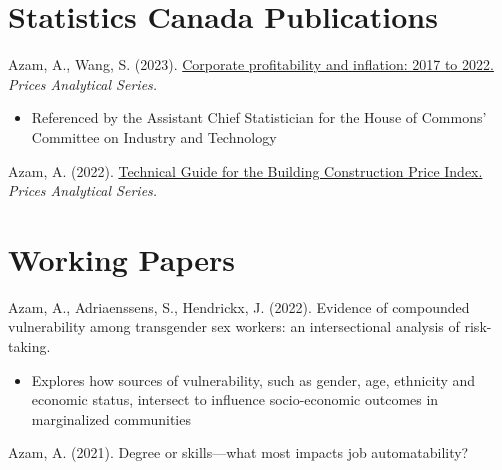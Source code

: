 \documentclass[letterpaper,11pt]{article}
\newcommand{\resumeItem}[1]{
  \item\small{
    {#1 \vspace{-2pt}}
  }
}
\newcommand{\resumeItemListStart}{\begin{itemize}}
\newcommand{\resumeItemListEnd}{\end{itemize}\vspace{-5pt}}
\begin{document}
\section{Statistics Canada Publications}

\begin{itemize}[leftmargin=0.15in, label={}]
    {\item{
     Azam, A., Wang, S. (2023). \href{https://www150.statcan.gc.ca/n1/en/catalogue/62F0014M2023004}{Corporate profitability and inflation: 2017 to 2022.} \textit{Prices Analytical Series.}
    }}
    \vspace{-8pt} 
 \end{itemize}
 
        \resumeItemListStart
        \resumeItem{Referenced by the Assistant Chief Statistician for the House of Commons’ Committee on Industry and Technology}
        \vspace{-10pt} 
        \resumeItemListEnd 

\begin{itemize}[leftmargin=0.15in, label={}]
    {\item{
    Azam, A. (2022). \href{https://www150.statcan.gc.ca/n1/pub/62f0014m/62f0014m2022005-eng.htm}{Technical Guide for the Building Construction Price Index.} \textit{Prices Analytical Series.}
    }}
 \end{itemize}

\section{Working Papers}

\begin{itemize}[leftmargin=0.15in, label={}]
    {\item{
     Azam, A., Adriaenssens, S., Hendrickx, J. (2022). Evidence of compounded vulnerability among transgender sex workers: an intersectional analysis of risk-taking.
    }}
    \vspace{-8pt} 
 \end{itemize}
 
        \resumeItemListStart
        \resumeItem{Explores how sources of vulnerability, such as gender, age, ethnicity and economic status, intersect to influence socio-economic outcomes in marginalized communities}
        \vspace{-10pt} 
        \resumeItemListEnd 

\begin{itemize}[leftmargin=0.15in, label={}]
    {\item{
     Azam, A. (2021). Degree or skills—what most impacts job automatability?
    }}
    \vspace{-8pt} 
 \end{itemize}
 
\end{document}
